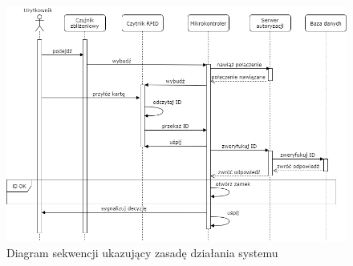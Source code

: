                 \begin{figure}[]
                        \includegraphics[width=\linewidth]{chapters/images/sequence1.png}
                        \caption{Diagram sekwencji ukazujący zasadę działania systemu}
                        \label{fig:sequence1}
                \end{figure}

